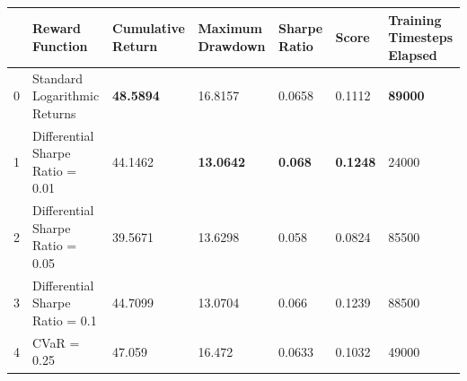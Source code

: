 \begin{tabular}{lllllll}
\toprule
 & Reward Function & Cumulative Return & Maximum Drawdown & Sharpe Ratio & Score & Training Timesteps Elapsed \\
\midrule
0 & Standard Logarithmic Returns & \textbf{48.5894} & 16.8157 & 0.0658 & 0.1112 & \textbf{89000} \\
1 & Differential Sharpe Ratio = 0.01 & 44.1462 & \textbf{13.0642} & \textbf{0.068} & \textbf{0.1248} & 24000 \\
2 & Differential Sharpe Ratio = 0.05 & 39.5671 & 13.6298 & 0.058 & 0.0824 & 85500 \\
3 & Differential Sharpe Ratio = 0.1 & 44.7099 & 13.0704 & 0.066 & 0.1239 & 88500 \\
4 & CVaR = 0.25 & 47.059 & 16.472 & 0.0633 & 0.1032 & 49000 \\
\bottomrule
\end{tabular}
